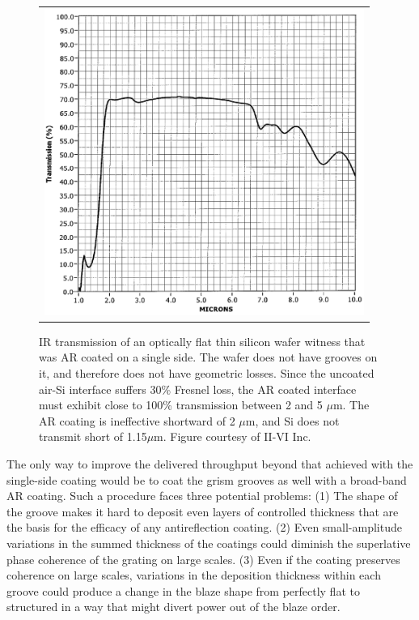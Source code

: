    \begin{figure}
   \begin{center}
   \begin{tabular}{c}
   \includegraphics[height=10cm]{chSPIE_2010_JWST/figs/ARcoat_trans_siww}
   \end{tabular}
   \end{center}
   \caption[Transmission of single side AR coated silicon wafer witness] {\label{fig:im4}  IR transmission of an optically flat thin silicon wafer witness that was AR coated on a single side.  The wafer does not have grooves on it, and therefore does not have geometric losses.  Since the uncoated air-Si interface suffers 30\% Fresnel loss, the AR coated interface must exhibit close to 100\% transmission between 2 and 5 $\mu$m.  The AR coating is ineffective shortward of 2 $\mu$m, and Si does not transmit short of 1.15$\mu$m.  Figure courtesy of II-VI Inc.} 
   \end{figure} 
 
The only way to improve the delivered throughput beyond that achieved with the single-side coating would be to coat the grism grooves as well with a broad-band AR coating.  Such a procedure faces three potential problems:  (1) The shape of the groove makes it hard to deposit even layers of controlled thickness that are the basis for the efficacy of any antireflection coating. (2) Even small-amplitude variations in the summed thickness of the coatings could diminish the superlative phase coherence of the grating on large scales. (3) Even if the coating preserves coherence on large scales, variations in the deposition thickness within each groove could produce a change in the blaze shape from perfectly flat to structured in a way that might divert power out of the blaze order.

